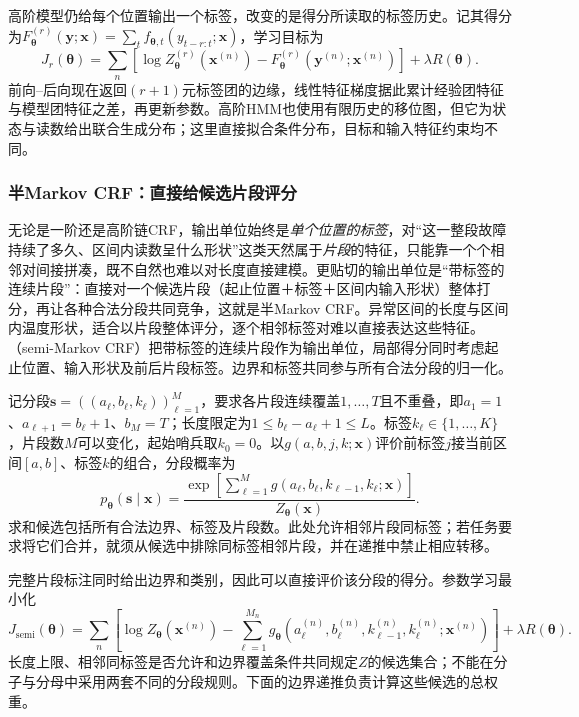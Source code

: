 高阶模型仍给每个位置输出一个标签，改变的是得分所读取的标签历史。记其得分为$F^{(r)}_{\bm\theta}(\bm y;\bm x)=\sum_t f_{\bm\theta,t}(y_{t-r:t};\bm x)$，学习目标为
\begin{equation}
  J_r(\bm\theta)=\sum_n
       [\log Z^{(r)}_{\bm\theta}(\bm x^{(n)})
          -F^{(r)}_{\bm\theta}(\bm y^{(n)};\bm x^{(n)})]
       +\lambda R(\bm\theta).
  \label{eq:pgm-dynamic-undirected-higher-objective}
\end{equation}
前向--后向现在返回$(r+1)$元标签团的边缘，线性特征梯度据此累计经验团特征与模型团特征之差，再更新参数。高阶HMM也使用有限历史的移位图，但它为状态与读数给出联合生成分布；这里直接拟合条件分布，目标和输入特征约束均不同。
\subsubsection{半Markov CRF：直接给候选片段评分}
\label{sec:pgm-energy-models-semi-higher}


无论是一阶还是高阶链CRF，输出单位始终是\emph{单个位置的标签}，对“这一整段故障持续了多久、区间内读数呈什么形状”这类天然属于\emph{片段}的特征，只能靠一个个相邻对间接拼凑，既不自然也难以对长度直接建模。更贴切的输出单位是“带标签的连续片段”：直接对一个候选片段（起止位置＋标签＋区间内输入形状）整体打分，再让各种合法分段共同竞争，这就是半Markov CRF。异常区间的长度与区间内温度形状，适合以片段整体评分，逐个相邻标签对难以直接表达这些特征。（semi-Markov CRF）把带标签的连续片段作为输出单位，局部得分同时考虑起止位置、输入形状及前后片段标签。边界和标签共同参与所有合法分段的归一化。

记分段$\bm{s}=((a_\ell,b_\ell,k_\ell))_{\ell=1}^M$，要求各片段连续覆盖$1,\ldots,T$且不重叠，即$a_1=1$、$a_{\ell+1}=b_\ell+1$、$b_M=T$；长度限定为$1\leq b_\ell-a_\ell+1\leq L$。标签$k_\ell\in\{1,\ldots,K\}$，片段数$M$可以变化，起始哨兵取$k_0=0$。以$g(a,b,j,k;\bm{x})$评价前标签$j$接当前区间$[a,b]$、标签$k$的组合，分段概率为
\begin{equation}
  p_{\bm{\theta}}(\bm{s}\mid\bm{x})
   =\frac{\exp\!\left[
        \sum_{\ell=1}^M
          g(a_\ell,b_\ell,k_{\ell-1},k_\ell;\bm{x})
                    \right]}
          {Z_{\bm{\theta}}(\bm{x})}.
  \label{eq:pgm-energy-models-semi-distribution}
\end{equation}
求和候选包括所有合法边界、标签及片段数。此处允许相邻片段同标签；若任务要求将它们合并，就须从候选中排除同标签相邻片段，并在递推中禁止相应转移。

完整片段标注同时给出边界和类别，因此可以直接评价该分段的得分。参数学习最小化
\begin{equation}
  J_{\mathrm{semi}}(\bm\theta)=\sum_n
   \left[\log Z_{\bm\theta}(\bm x^{(n)})
     -\sum_{\ell=1}^{M_n}
       g_{\bm\theta}(a_\ell^{(n)},b_\ell^{(n)},k_{\ell-1}^{(n)},
                         k_\ell^{(n)};\bm x^{(n)})\right]
       +\lambda R(\bm\theta).
  \label{eq:pgm-dynamic-undirected-semi-objective}
\end{equation}
长度上限、相邻同标签是否允许和边界覆盖条件共同规定$Z$的候选集合；不能在分子与分母中采用两套不同的分段规则。下面的边界递推负责计算这些候选的总权重。

